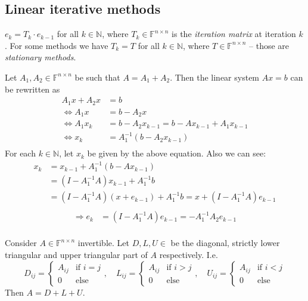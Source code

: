 \documentclass[12pt]{article}
\theoremstyle{definition}
\theoremstyle{remark}
\numberwithin{equation}{section}
\newcommand{\F}{\mathbb{F}}
\newcommand{\N}{\mathbb{N}}
\begin{document}
\subsection{Linear iterative methods}
$e_k = T_k \cdot e_{k-1}$ for all $k \in \N$, where $T_k \in \F^{n \times n}$ is the \emph{iteration matrix} at iteration $k$. For some methods we have $T_k = T$ for all $k \in \N$, where $T \in \F^{n \times n}$ -- those are \emph{stationary methods}.

Let $A_1, A_2 \in \F^{n \times n}$ be such that $A=A_1 + A_2$. Then the linear system $Ax = b$ can be rewritten as
\begin{align*}
  A_1x + A_2x &= b \\
  \Leftrightarrow A_1x &= b - A_2x \\
  \Leftrightarrow A_1x_k &= b - A_2x_{k-1}  = b - Ax_{k-1} + A_1 x_{k-1}\\
  \Leftrightarrow x_k &= A_1^{-1}(b - A_2x_{k-1}) \\
\end{align*}
For each $k \in \N$, let $x_k$ be given by the above equation. Also we can see:
\begin{align*}
  x_k &= x_{k-1} + A_1^{-1}(b - Ax_{k-1}) \\
  &= (I-A_1^{-1}A)x_{k-1} + A_1^{-1}b \\
  &= (I - A_1^{-1}A)(x+e_{k-1}) + A_1^{-1}b = x + (I - A_1^{-1}A)e_{k-1} \\
\end{align*}
\begin{align*}
  \Rightarrow e_k &= (I - A_1^{-1}A)e_{k-1} = -A_1^{-1} A_2e_{k-1} \\
\end{align*}

Consider $A\in \F^{n\times n}$ invertible. Let $D,L,U \in$ be the diagonal, strictly lower triangular and upper triangular part of $A$ respectively. I.e.
\begin{equation*}
  D_{ij} =
  \begin{cases}
    A_{ij} & \text{if } i = j\\
    0 & \text{else}
  \end{cases},\quad L_{ij} =
  \begin{cases}
    A_{ij} & \text{if } i > j\\
    0 & \text{else}
  \end{cases},\quad U_{ij} =
  \begin{cases}
    A_{ij} & \text{if } i < j\\
    0 & \text{else}
  \end{cases}
\end{equation*}
Then $A = D + L + U$.
\end{document}
